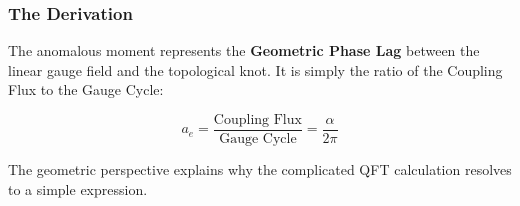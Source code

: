 \subsubsection{The Derivation}

The anomalous moment represents the \textbf{Geometric Phase Lag} between the linear gauge field and the topological knot. It is simply the ratio of the Coupling Flux to the Gauge Cycle:

\begin{equation}
a_e = \frac{\text{Coupling Flux}}{\text{Gauge Cycle}} = \frac{\alpha}{2\pi}
\end{equation}

The geometric perspective explains why the complicated QFT calculation resolves to a simple expression.
